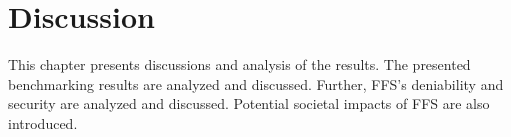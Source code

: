 
\chapter{Discussion}
\label{ch:discussion}
This chapter presents discussions and analysis of the results. The presented benchmarking results are analyzed and discussed. Further, \gls{FFS}'s deniability and security are analyzed and discussed. Potential societal impacts of \gls{FFS} are also introduced.






